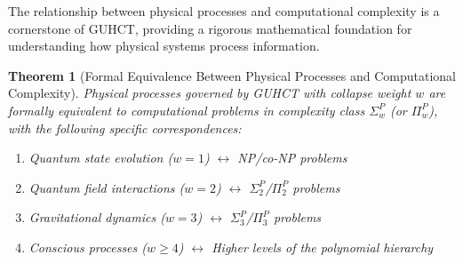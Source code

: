 \documentclass[11pt,a4paper]{article}
\newtheorem{theorem}{Theorem}[section]
\begin{document}
The relationship between physical processes and computational complexity is a cornerstone of GUHCT, providing a rigorous mathematical foundation for understanding how physical systems process information.

\begin{theorem}[Formal Equivalence Between Physical Processes and Computational Complexity]
\label{thm:physical_computational_equivalence}
Physical processes governed by GUHCT with collapse weight $w$ are formally equivalent to computational problems in complexity class $\Sigma_w^P$ (or $\Pi_w^P$), with the following specific correspondences:
\begin{enumerate}
    \item Quantum state evolution ($w=1$) $\leftrightarrow$ NP/co-NP problems
    \item Quantum field interactions ($w=2$) $\leftrightarrow$ $\Sigma_2^P$/$\Pi_2^P$ problems
    \item Gravitational dynamics ($w=3$) $\leftrightarrow$ $\Sigma_3^P$/$\Pi_3^P$ problems
    \item Conscious processes ($w \geq 4$) $\leftrightarrow$ Higher levels of the polynomial hierarchy
\end{enumerate}
\end{theorem}
\end{document}
